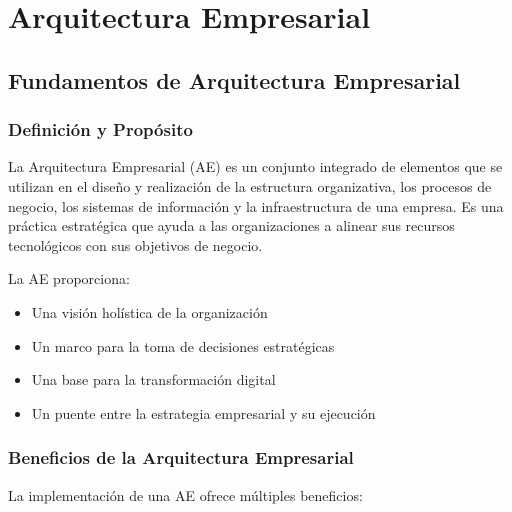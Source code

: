 

\chapter{Arquitectura Empresarial}

\section{Fundamentos de Arquitectura Empresarial}

\subsection{Definición y Propósito}

La Arquitectura Empresarial (AE) es un conjunto integrado de elementos que se utilizan en el diseño y realización de la estructura organizativa, los procesos de negocio, los sistemas de información y la infraestructura de una empresa. Es una práctica estratégica que ayuda a las organizaciones a alinear sus recursos tecnológicos con sus objetivos de negocio.

La AE proporciona:
\begin{itemize}
\item Una visión holística de la organización
\item Un marco para la toma de decisiones estratégicas
\item Una base para la transformación digital
\item Un puente entre la estrategia empresarial y su ejecución
\end{itemize}

\subsection{Beneficios de la Arquitectura Empresarial}

La implementación de una AE ofrece múltiples beneficios:

